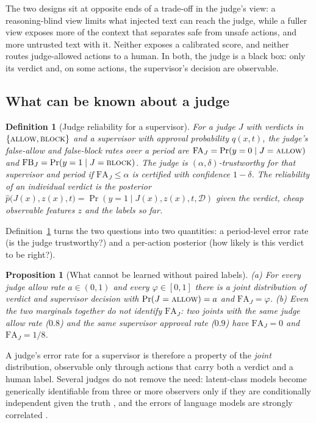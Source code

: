 \documentclass[11pt]{article}
\newtheorem{definition}{Definition}
\newtheorem{proposition}{Proposition}
\begin{document}
The two designs sit at opposite ends of a trade-off in the judge's view: a
reasoning-blind view limits what injected text can reach the judge, while a
fuller view exposes more of the context that separates safe from unsafe
actions, and more untrusted text with it. Neither exposes a calibrated score,
and neither routes judge-allowed actions to a human. In both, the judge is a
black box: only its verdict and, on some actions, the supervisor's decision
are observable.

\subsection{What can be known about a judge}\label{sec:judge-theory}

\begin{definition}[Judge reliability for a supervisor]\label{def:judge}
For a judge $J$ with verdicts in $\{\textsc{allow}, \textsc{block}\}$ and a
supervisor with approval probability $q(x,t)$, the judge's false-allow and
false-block rates over a period are
$\mathrm{FA}_J = \Pr(y = 0 \mid J = \textsc{allow})$ and
$\mathrm{FB}_J = \Pr(y = 1 \mid J = \textsc{block})$. The judge is
\emph{$(\alpha,\delta)$-trustworthy} for that supervisor and period if
$\mathrm{FA}_J \le \alpha$ is certified with confidence $1-\delta$. The
reliability of an individual verdict is the posterior
$\hat p\bigl(J(x), z(x), t\bigr) = \Pr(y = 1 \mid J(x), z(x), t, \mathcal D)$
given the verdict, cheap observable features $z$ and the labels so far.
\end{definition}

Definition~\ref{def:judge} turns the two questions into two quantities: a
period-level error rate (is the judge trustworthy?) and a per-action
posterior (how likely is this verdict to be right?).

\begin{proposition}[What cannot be learned without paired labels]\label{prop:judge-ident}
(a) For every judge allow rate $a \in (0,1)$ and every $\varphi \in [0,1]$
there is a joint distribution of verdict and supervisor decision with
$\Pr(J = \textsc{allow}) = a$ and $\mathrm{FA}_J = \varphi$. (b) Even the two
marginals together do not identify $\mathrm{FA}_J$: two joints with the same
judge allow rate ($0.8$) and the same supervisor approval rate ($0.9$) have
$\mathrm{FA}_J = 0$ and $\mathrm{FA}_J = 1/8$.
\end{proposition}

A judge's error rate for a supervisor is therefore a property of the
\emph{joint} distribution, observable only through actions that carry both a
verdict and a human label. Several judges do not remove the need: latent-class
models become generically identifiable from three or more observers only if
they are conditionally independent given the truth
\citep{dawid1979maximum,allman2009identifiability}, and the errors of language
models are strongly correlated \citep{kim2025correlated,goel2025great}.
\end{document}
